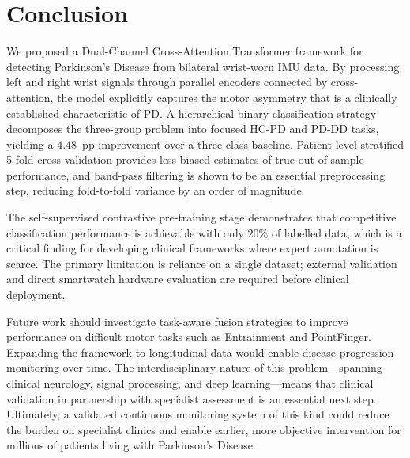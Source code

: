 \documentclass[pmlr]{jmlr}
\begin{document}
\section{Conclusion}
\label{sec:conclusion}

We proposed a Dual-Channel Cross-Attention Transformer framework for
detecting Parkinson's Disease from bilateral wrist-worn IMU data. By
processing left and right wrist signals through parallel encoders
connected by cross-attention, the model explicitly captures the motor
asymmetry that is a clinically established characteristic of PD. A
hierarchical binary classification strategy decomposes the
three-group problem into focused HC-PD and PD-DD tasks, yielding a
$4.48$~pp improvement over a three-class baseline. Patient-level
stratified 5-fold cross-validation provides less biased estimates of
true out-of-sample performance, and band-pass filtering is shown to
be an essential preprocessing step, reducing fold-to-fold variance by
an order of magnitude.

The self-supervised contrastive pre-training stage demonstrates that
competitive classification performance is achievable with only $20\%$
of labelled data, which is a critical finding for developing clinical
frameworks where expert annotation is scarce. The primary limitation
is reliance on a single dataset; external validation and direct
smartwatch hardware evaluation are required before clinical deployment.

Future work should investigate task-aware fusion strategies to improve
performance on difficult motor tasks such as Entrainment and
PointFinger. Expanding the framework to longitudinal data would enable
disease progression monitoring over time. The interdisciplinary nature
of this problem---spanning clinical neurology, signal processing, and
deep learning---means that clinical validation in partnership with
specialist assessment is an essential next step. Ultimately, a
validated continuous monitoring system of this kind could reduce the
burden on specialist clinics and enable earlier, more objective
intervention for millions of patients living with Parkinson's Disease.


% 

\end{document}
